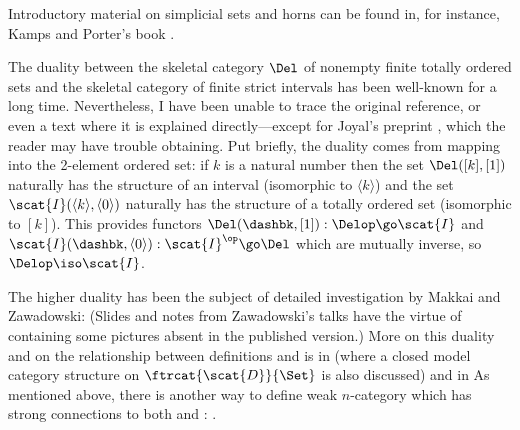 Introductory material on simplicial sets and horns can be found in, for
instance, Kamps and Porter's book .

The duality between the skeletal category $\Del$ of nonempty finite totally
ordered sets and the skeletal category  of finite strict intervals
has been well-known for a long time.  Nevertheless, I have been unable to
trace the original reference, or even a text where it is explained
directly---except for Joyal's preprint , which the reader may have
trouble obtaining.  Put briefly, the duality comes from mapping into the
2-element ordered set: if $k$ is a natural number then the set
$\Del([k],[1])$ naturally has the structure of an interval (isomorphic to
$\langle k\rangle$) and the set $\scat{I}(\langle k\rangle, \langle
0\rangle)$ naturally has the structure of a totally ordered set (isomorphic
to $[k]$).  This provides functors $\Del(\dashbk,[1]): \Delop \go \scat{I}$
and $\scat{I}(\dashbk, \langle 0\rangle): \scat{I}^\op \go \Del$ which are
mutually inverse, so $\Delop \iso \scat{I}$.

The higher duality has been the subject of detailed investigation by Makkai
and Zawadowski:
% 
%
% 
% 
%
% 
% 
%
%
(Slides and notes from Zawadowski's talks have the virtue of containing some
pictures absent in the published version.)  More on this duality and on the
relationship between definitions  and  is in
% 
%
% 
(where a closed model category structure on $\ftrcat{\scat{D}}{\Set}$ is
also discussed) and in
% 
% 
% 
As mentioned above, there is another way to define weak $n$-category which
has strong connections to both  and : .



